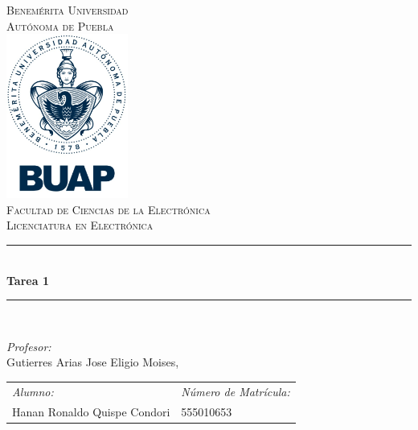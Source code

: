 \documentclass[12pt]{article}
\date{\today}
\begin{document}
\begin{titlepage}
\newcommand{\HRule}{\rule{\linewidth}{0.5mm}} 
\center
\textsc{\LARGE  Benemérita Universidad \\[0.2cm] Autónoma de Puebla}\\[1.5cm] 
\includegraphics[width=4cm]{IMAGENES/escudo}\\[1cm]
\textsc{\Large Facultad de Ciencias de la Electrónica}\\[0.5cm] 
\textsc{\large Licenciatura en Electrónica}\\[0.5cm]
\HRule \\[0.4cm]
{ \huge \bfseries Tarea 1}\\[0.4cm] 
\HRule \\[1.5cm]
\begin{minipage}{\textwidth}
\center 

\emph{Profesor:} \\
Gutierres Arias Jose Eligio Moises, \\[1cm]
\vspace{10mm}
\begin{tabular}{ll}
\emph{Alumno:} & \emph{Número de Matrícula:}\\
Hanan Ronaldo Quispe Condori  & 555010653 \\
\end{tabular}
\end{minipage}\\[2cm]
\end{titlepage}



\end{document}
